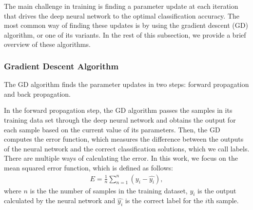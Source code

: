 \documentclass[conference]{IEEEtran}
\begin{document}

The main challenge in training is finding a parameter update at each iteration that drives the deep neural network to the optimal
classification accuracy. The most common way of finding these updates is by using the gradient descent (GD) algorithm, or one of its
variants. In the rest of this subsection, we provide a brief overview of these algorithms. 

\subsubsection{Gradient Descent Algorithm}
The GD algorithm finds the parameter updates in two steps: forward propagation and back propagation. 

In the forward propagation step, the GD algorithm passes the samples in its training data set through the
deep neural network and obtains the output for each sample based on the current value of its parameters. Then, the GD computes the
error function, which measures the difference between the outputs of the neural network and the correct classification solutions,
which we call labels. There are multiple ways of calculating the error. In this work, we focus on the mean squared error function,
which is defined as follows:
\begin{align}\label{eq:errorFunction}
 E= \frac{1}{n} \sum_{n=1}^{n}(y_i -\hat{y_i}),
\end{align}
where $n$ is the the number of samples in the training dataset, $y_i$ is the output calculated by the neural network and 
$\hat{y_i}$ is the correct label for the $i$th sample.
\end{document}

